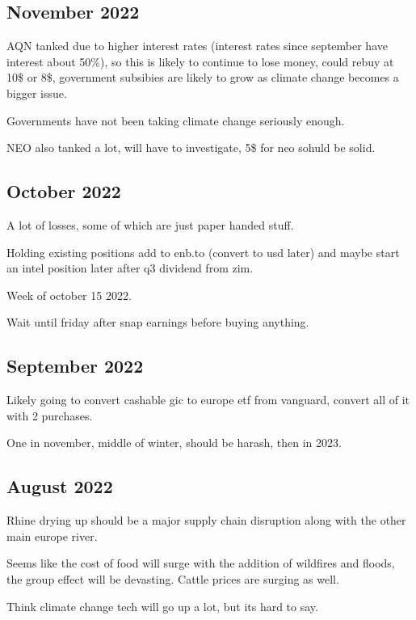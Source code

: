 \subsection{November 2022}

AQN tanked due to higher interest rates (interest rates since september have interest about 50\%), so this is likely to continue to lose money, could rebuy at 10\$ or 8\$, government subsibies are likely to grow as climate change becomes a bigger issue.

Governments have not been taking climate change seriously enough.

NEO also tanked a lot, will have to investigate, 5\$ for neo sohuld be solid.
\subsection{October 2022}

A lot of losses, some of which are just paper handed stuff.

Holding existing positions add to enb.to (convert to usd later) and maybe start an intel position later after q3 dividend from zim.

Week of october 15 2022.

Wait until friday after snap earnings before buying anything.



\subsection{September 2022}

Likely going to convert cashable gic to europe etf from vanguard, convert all of it with 2 purchases.

One in november, middle of winter, should be harash, then in 2023.

\subsection{August 2022}

Rhine drying up should be a major supply chain disruption along with the other main europe river.

Seems like the cost of food will surge with the addition of wildfires and floods, the group effect will be devasting. Cattle prices are surging as well.

Think climate change tech will go up a lot, but its hard to say.

